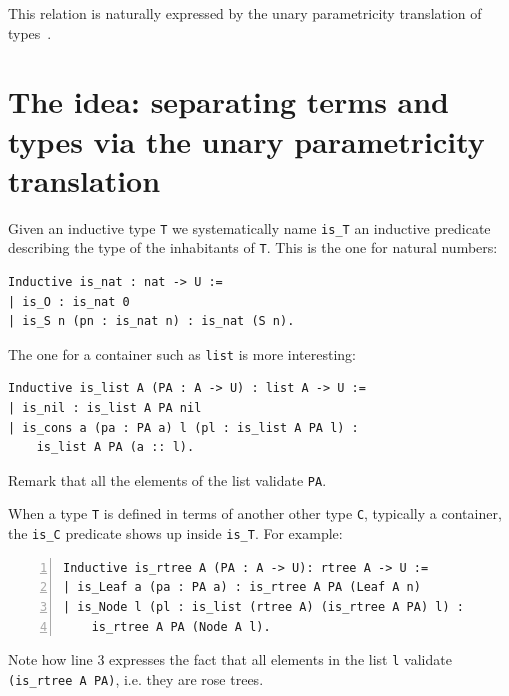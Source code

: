 \documentclass[sigplan,10pt,review]{acmart}\settopmatter{printfolios=true,printccs=false,printacmref=false}
\begin{document}
This relation is naturally expressed by the unary parametricity
translation of types~\cite{Wadler:1989:TF:99370.99404}.

\section{The idea: separating terms and types via the unary parametricity translation}
\label{sec:idea}

Given an inductive type \lstinline+T+ we systematically name \lstinline+is_T+
an inductive predicate describing the type of the inhabitants of
\lstinline+T+. This is the one for natural numbers:

\begin{minipage}{\textwidth}\begin{lstlisting}
Inductive is_nat : nat -> U :=
| is_O : is_nat 0
| is_S n (pn : is_nat n) : is_nat (S n).
\end{lstlisting}\end{minipage}

\noindent
The one for a container such as \lstinline+list+ is more interesting:

\begin{minipage}{\textwidth}\begin{lstlisting}
Inductive is_list A (PA : A -> U) : list A -> U :=
| is_nil : is_list A PA nil
| is_cons a (pa : PA a) l (pl : is_list A PA l) :
    is_list A PA (a :: l).
\end{lstlisting}\end{minipage}

\noindent
Remark that all the elements of the list validate \lstinline+PA+.

When a type \lstinline+T+ is defined in terms of another other type
\lstinline+C+, typically a container, the \lstinline+is_C+ predicate
shows up inside \lstinline+is_T+. For example:

\begin{minipage}{\textwidth}\begin{lstlisting}[numbers=left]
Inductive is_rtree A (PA : A -> U): rtree A -> U :=
| is_Leaf a (pa : PA a) : is_rtree A PA (Leaf A n)
| is_Node l (pl : is_list (rtree A) (is_rtree A PA) l) :
    is_rtree A PA (Node A l).
\end{lstlisting}\end{minipage}

\noindent
Note how line 3 expresses the fact that all elements in the list
\lstinline+l+ validate \lstinline+(is_rtree A PA)+, i.e. they are
rose trees.
\end{document}
